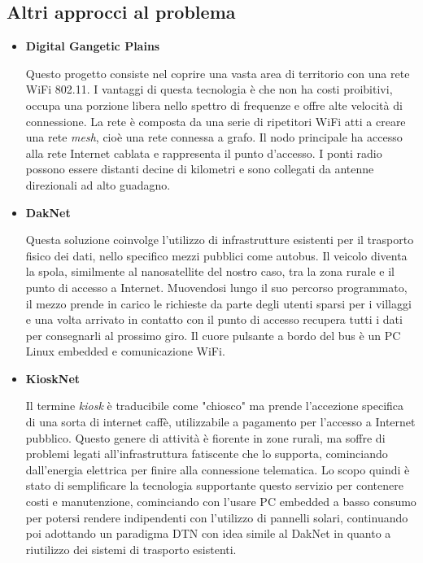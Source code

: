\documentclass[12pt,a4paper,oneside]{book}
\begin{document}
			\subsection{Altri approcci al problema}
			
			\begin{itemize}
				\item {\bf Digital Gangetic Plains \cite{raman2007experiences}}
				
				Questo progetto consiste nel coprire una vasta area di territorio con una rete WiFi 802.11. I vantaggi di questa tecnologia è che non ha costi proibitivi, occupa una porzione libera nello spettro di frequenze e offre alte velocità di connessione. La rete è composta da una serie di ripetitori WiFi atti a creare una rete {\it mesh}, cioè una rete connessa a grafo. Il nodo principale ha accesso alla rete Internet cablata e rappresenta il punto d'accesso. I ponti radio possono essere distanti decine di kilometri e sono collegati da antenne direzionali ad alto guadagno. 
				
				\item {\bf DakNet \cite{hasson2003daknet}}
				
				Questa soluzione coinvolge l'utilizzo di infrastrutture esistenti per il trasporto fisico dei dati, nello specifico mezzi pubblici come autobus. Il veicolo diventa la spola, similmente al nanosatellite del nostro caso, tra la zona rurale e il punto di accesso a Internet. Muovendosi lungo il suo percorso programmato, il mezzo prende in carico le richieste da parte degli utenti sparsi per i villaggi e una volta arrivato in contatto con il punto di accesso recupera tutti i dati per consegnarli al prossimo giro. Il cuore pulsante a bordo del bus è un PC Linux embedded e comunicazione WiFi. 
				
				\item {\bf KioskNet \cite{seth2006low}}
				
				Il termine {\it kiosk} è traducibile come "chiosco" ma prende l'accezione specifica di una sorta di internet caffè, utilizzabile a pagamento per l'accesso a Internet pubblico. Questo genere di attività è fiorente in zone rurali, ma soffre di problemi legati all'infrastruttura fatiscente che lo supporta, cominciando dall'energia elettrica per finire alla connessione telematica. Lo scopo quindi è stato di semplificare la tecnologia supportante questo servizio per contenere costi e manutenzione, cominciando con l'usare PC embedded a basso consumo per potersi rendere indipendenti con l'utilizzo di pannelli solari, continuando poi adottando un paradigma DTN con idea simile al DakNet in quanto a riutilizzo dei sistemi di trasporto esistenti.
								
			\end{itemize}
			
\end{document}

